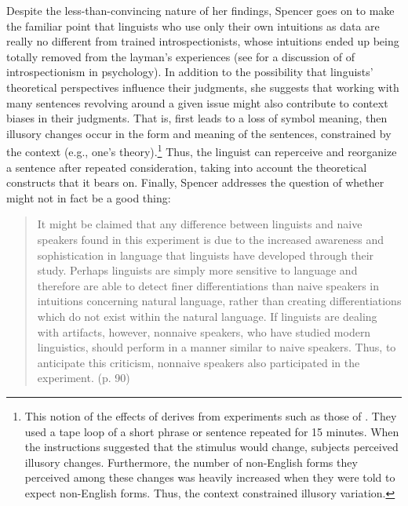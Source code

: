 Despite the less-than-convincing nature of her findings, Spencer goes on to make the familiar point that linguists who use only their own intuitions as data are really no different from trained introspectionists, whose intuitions ended up being totally removed from the layman's experiences (see  for a discussion of  of introspectionism in psychology). In addition to the possibility that linguists' theoretical perspectives influence their judgments, she suggests that working with many sentences revolving around a given issue might also contribute to context biases in their judgments. That is,  first leads to a loss of symbol meaning, then illusory changes occur in the form and meaning of the sentences, constrained by the context (e.g., one's theory).\footnote{This notion of the effects of  derives from experiments such as those of \citet{TaylorEtAl1963}. They used a tape loop of a short phrase or sentence repeated for 15 minutes. When the instructions suggested that the stimulus would change, subjects perceived illusory changes. Furthermore, the number of non-English forms they perceived among these changes was heavily increased when they were told to expect non-English forms. Thus, the context constrained illusory variation.
}
 Thus, the linguist can reperceive and reorganize a sentence after repeated consideration, taking into account the theoretical constructs that it bears on. Finally, Spencer addresses the question of whether  might not in fact be a good thing:

 \begin{quote}
It might be claimed that any difference between linguists and naive speakers found in this experiment is due to the increased awareness and sophistication in language that linguists have developed through their study. Perhaps linguists are simply more sensitive to language and therefore are able to detect finer differentiations than naive speakers in intuitions concerning natural language, rather than creating differentiations which do not exist within the natural language. If linguists are dealing with artifacts, however, nonnaive speakers, who have studied modern linguistics, should perform in a manner similar to naive speakers. Thus, to anticipate this criticism, nonnaive speakers also participated in the experiment. (p. 90)
 \end{quote}

